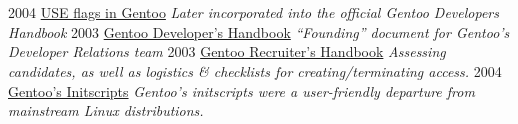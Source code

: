 \documentclass[]{friggeri-cv} %
\begin{document}
\section{{} {} {\normalsize {}~~}}
\begin{entrylist}
\entry
{2004}
{\href{http://www.gentoo.org/doc/en/handbook/handbook-x86.xml?part=2&chap=2}{USE flags in Gentoo}}
{}
{\emph{Later incorporated into the official \textup{Gentoo Developers Handbook}}}
\entry
{2003}
{\href{http://www.gentoo.org/proj/en/devrel/handbook/handbook.xml}{Gentoo Developer's Handbook}}
{}
{\emph{``Founding'' document for Gentoo's Developer Relations team}}
\entry
{2003}
{\href{http://www.gentoo.org/proj/en/devrel/recruiters/}{Gentoo Recruiter's Handbook}}
{}
{\emph{Assessing candidates, as well as logistics \& checklists for creating/terminating access.}}
\entry
{2004}
{\href{http://www.gentoo.org/doc/en/handbook/handbook-x86.xml?part=2&chap=4}{Gentoo's Initscripts}}
{}
{\emph{Gentoo's initscripts were a user-friendly departure from mainstream Linux distributions.}}
\end{entrylist}
\end{document}

